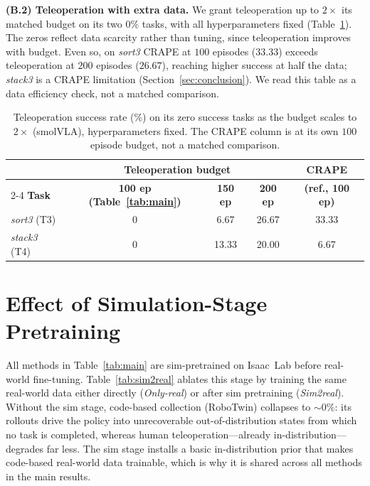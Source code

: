 \documentclass{article}
\begin{document}
\textbf{(B.2) Teleoperation with extra data.}
We grant teleoperation up to $2\times$ its matched budget on its two $0\%$ tasks,
with all hyperparameters fixed (Table~\ref{tab:teleop_saturation}). The zeros
reflect data scarcity rather than tuning, since teleoperation improves with
budget. Even so, on \textit{sort3} CRAPE at $100$ episodes ($33.33$) exceeds
teleoperation at $200$ episodes ($26.67$), reaching higher success at half the
data; \textit{stack3} is a CRAPE limitation (Section~\ref{sec:conclusion}). We
read this table as a data efficiency check, not a matched comparison.

\begin{table}[h]
\centering
\caption{Teleoperation success rate (\%) on its zero success tasks as the budget scales to $2\times$ (smolVLA), hyperparameters fixed. The CRAPE column is at its own $100$ episode budget, not a matched comparison.}
\label{tab:teleop_saturation}
\small
\setlength{\tabcolsep}{6pt}
\begin{tabular}{lccc|c}
\toprule
& \multicolumn{3}{c|}{\textbf{Teleoperation budget}} & \textbf{CRAPE} \\
\cmidrule(lr){2-4}
\textbf{Task} & \textbf{100 ep (Table~\ref{tab:main})} & \textbf{150 ep} & \textbf{200 ep} & \textbf{(ref., 100 ep)} \\
\midrule
\textit{sort3} (T3)  & 0 & 6.67 & 26.67 & 33.33 \\
\textit{stack3} (T4) & 0 & 13.33 & 20.00 & 6.67 \\
\bottomrule
\end{tabular}
\end{table}

\section{Effect of Simulation-Stage Pretraining}
\label{app:sim2real}

All methods in Table~\ref{tab:main} are sim-pretrained on Isaac~Lab before
real-world fine-tuning. Table~\ref{tab:sim2real} ablates this stage by training
the same real-world data either directly (\emph{Only-real}) or after sim
pretraining (\emph{Sim2real}). Without the sim stage, code-based collection
(RoboTwin) collapses to $\sim\!0\%$: its rollouts drive the policy into
unrecoverable out-of-distribution states from which no task is completed, whereas
human teleoperation---already in-distribution---degrades far less. The sim stage
installs a basic in-distribution prior that makes code-based real-world data
trainable, which is why it is shared across all methods in the main results.
\end{document}
